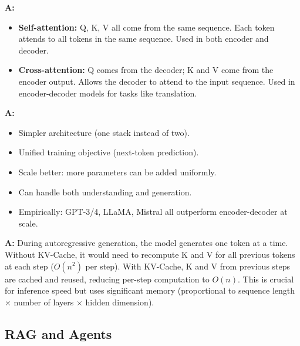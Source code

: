 \documentclass[11pt,a4paper]{article}
\begin{document}
\begin{warnbox}
\textbf{A:}
\begin{itemize}[nosep]
  \item \textbf{Self-attention:} Q, K, V all come from the same sequence. Each token attends to all tokens in the same sequence. Used in both encoder and decoder.
  \item \textbf{Cross-attention:} Q comes from the decoder; K and V come from the encoder output. Allows the decoder to attend to the input sequence. Used in encoder-decoder models for tasks like translation.
\end{itemize}
\end{warnbox}

\begin{warnbox}
\textbf{A:}
\begin{itemize}[nosep]
  \item Simpler architecture (one stack instead of two).
  \item Unified training objective (next-token prediction).
  \item Scale better: more parameters can be added uniformly.
  \item Can handle both understanding and generation.
  \item Empirically: GPT-3/4, LLaMA, Mistral all outperform encoder-decoder at scale.
\end{itemize}
\end{warnbox}

\begin{warnbox}
\textbf{A:}
During autoregressive generation, the model generates one token at a time. Without KV-Cache, it would need to recompute K and V for all previous tokens at each step ($O(n^2)$ per step). With KV-Cache, K and V from previous steps are cached and reused, reducing per-step computation to $O(n)$. This is crucial for inference speed but uses significant memory (proportional to sequence length $\times$ number of layers $\times$ hidden dimension).
\end{warnbox}

\subsection{RAG and Agents}
\end{document}
